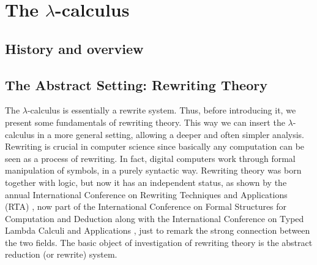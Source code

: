 \chapter{The $\lambda$-calculus}\label{ch:lambda}
\section{History and overview}
\section{The Abstract Setting: Rewriting Theory}
The $\lambda$-calculus is essentially a rewrite system. Thus, before introducing it, we present some fundamentals of rewriting theory. This way we can insert the $\lambda$-calculus in a more general setting, allowing a deeper and often simpler analysis. Rewriting is crucial in computer science since basically any computation can be seen as a process of rewriting. In fact, digital computers work through formal manipulation of symbols, in a purely syntactic way. Rewriting theory was born together with logic, but now it has an independent status, as shown by the annual International Conference on Rewriting Techniques and Applications (RTA) \cite{noauthor_rta_nodate}, now part of the International Conference on Formal Structures for Computation and Deduction along with the  International Conference on Typed Lambda Calculi and Applications \cite{noauthor_notitle_nodate}, just to remark the strong connection between the two fields. The basic object of investigation of rewriting theory is the abstract reduction (or rewrite) system. 

